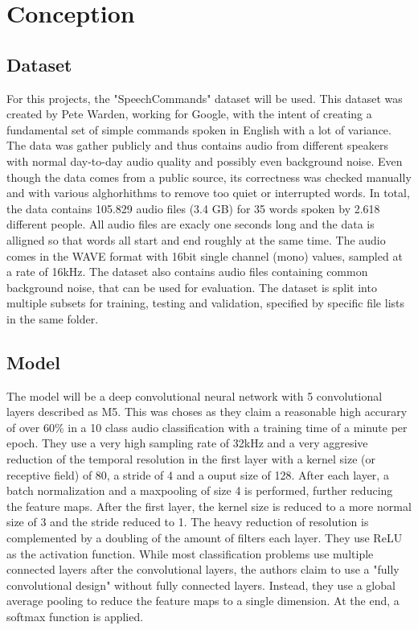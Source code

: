 \chapter{Conception}

\section{Dataset}
For this projects, the "SpeechCommands"\cite{warden2018speech} dataset will be used. This dataset was created by Pete Warden, 
working for Google, with the intent of creating a fundamental set of simple commands spoken in English with a lot of variance. 
The data was gather publicly and thus contains audio from different speakers with normal day-to-day audio quality and possibly even background noise. 
Even though the data comes from a public source, its correctness was checked manually and with various alghorhithms to remove too quiet or interrupted words. 
In total, the data contains 105.829 audio files (3.4 GB) for 35 words spoken by 2.618 different people. All audio files are exacly one seconds long and the data is alligned 
so that words all start and end roughly at the same time. The audio comes in the WAVE format with 16bit single channel (mono) values, sampled at a rate of 16kHz.
The dataset also contains audio files containing common background noise, that can be used for evaluation. The dataset is split into multiple subsets for 
training, testing and validation, specified by specific file lists in the same folder.

\section{Model} \label{model}
The model will be a deep convolutional neural network with 5 convolutional layers described as M5\cite{dai2016deep}. This was choses as they claim a reasonable high accurary of
over 60\% in a 10 class audio classification with a training time of a minute per epoch. They use a very high sampling rate of 32kHz and a very aggresive reduction of the temporal
resolution in the first layer with a kernel size (or receptive field) of 80, a stride of 4 and a ouput size of 128. After each layer, a batch normalization
and a maxpooling of size 4 is performed, further reducing the feature maps. After the first layer, the kernel size is reduced to a more normal size of 3 and the stride reduced to 1.
The heavy reduction of resolution is complemented by a doubling of the amount of filters each layer. They use ReLU as the activation function. While most classification
problems use multiple connected layers after the convolutional layers, the authors claim to use a "fully convolutional design" without fully connected layers. Instead, they
use a global average pooling to reduce the feature maps to a single dimension. At the end, a softmax function is applied.

